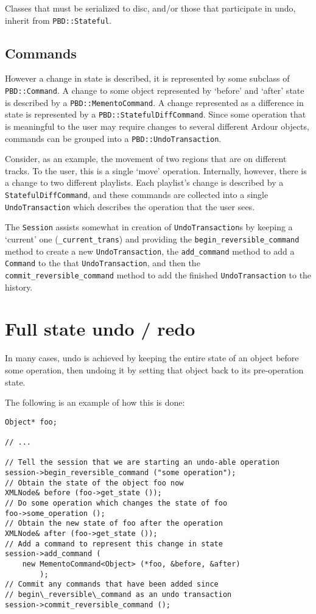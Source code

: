 \documentclass[10pt,a4paper]{book}
\newcommand{\code}[1]{\texttt{#1}}
\begin{document}
Classes that must be serialized to disc, and/or those that participate
in undo, inherit from \code{PBD::Stateful}.

\subsection{Commands}

However a change in state is described, it is represented by some
subclass of \code{PBD::Command}.  A change to some object represented
by `before' and `after' state is described by a
\code{PBD::MementoCommand}.  A change represented as a difference in
state is represented by a \code{PBD::StatefulDiffCommand}.  Since some
operation that is meaningful to the user may require changes to
several different Ardour objects, commands can be grouped into a
\code{PBD::UndoTransaction}.

Consider, as an example, the movement of two regions that are on
different tracks.  To the user, this is a single `move' operation.
Internally, however, there is a change to two different playlists.
Each playlist's change is described by a \code{StatefulDiffCommand},
and these commands are collected into a single \code{UndoTransaction}
which describes the operation that the user sees.

The \code{Session} assists somewhat in creation of
\code{UndoTransaction}s by keeping a `current' one
(\code{\_current\_trans}) and providing the
\code{begin\_reversible\_command} method to create a new
\code{UndoTransaction}, the \code{add\_command} method to add a
\code{Command} to the that \code{UndoTransaction}, and then the
\code{commit\_reversible\_command} method to add the finished
\code{UndoTransaction} to the history.


\section{Full state undo / redo}

In many cases, undo is achieved by keeping the entire state of an
object before some operation, then undoing it by setting that object
back to its pre-operation state.

The following is an example of how this is done:

\begin{lstlisting}
Object* foo;

// ...

// Tell the session that we are starting an undo-able operation
session->begin_reversible_command ("some operation");
// Obtain the state of the object foo now
XMLNode& before (foo->get_state ());
// Do some operation which changes the state of foo
foo->some_operation ();
// Obtain the new state of foo after the operation
XMLNode& after (foo->get_state ());
// Add a command to represent this change in state
session->add_command (
	new MementoCommand<Object> (*foo, &before, &after)
        );
// Commit any commands that have been added since
// begin\_reversible\_command as an undo transaction
session->commit_reversible_command ();
\end{lstlisting}
\end{document}
